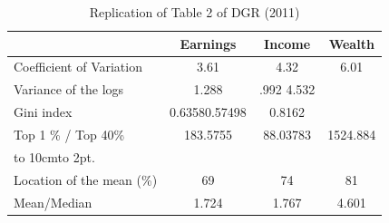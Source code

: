 \documentclass[12pt]{article}%
\def\dotfill#1{\cleaders\hbox to #1{.}\hfill}
\newcommand\dotline[2][.5em]{\leavevmode\hbox to #2{\dotfill{#1}\hfil}}
\begin{document}
\begin{enumerate}
	\begin {table}[H]
\footnotesize
\begin{center}
	\caption {Replication of Table 2 of DGR (2011)}
	\label{tab:Table2}
	{
		\begin{tabular}{l*{3}{c}}
			\hline
			&  Earnings&Income&Wealth\\
			\hline
			Coefficient of Variation &  3.61 &   4.32 &  6.01\\
			Variance of the logs  &1.288 & .992 4.532	 \\
			Gini index & 0.63580.57498&0.8162\\
			Top 1 \% /  Top 40\%&183.5755 &88.03783&1524.884 \\
			\multicolumn{4}{l}{\dotline[2pt]{10cm}} \\
			Location of the mean (\%) &69&74&81\\
			Mean/Median & 1.724 &	1.767 & 4.601\\
			\hline
		\end{tabular}
	}	
	
\end{center} 
\end {table}
	
	\vspace{3mm}
	

\end{enumerate}
\end{document}
